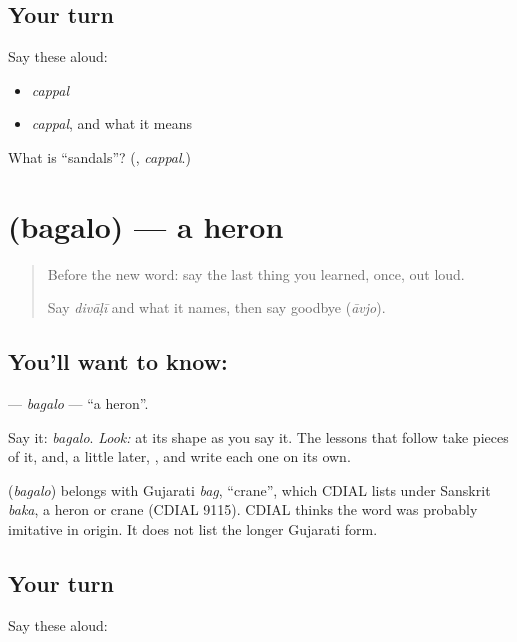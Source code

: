 \subsection*{Your turn}
Say these aloud:

\begin{itemize}
\raggedright
  \item \emph{cappal}
  \item \emph{cappal}, and what it means
\end{itemize}

\begin{tcolorbox}[breakable,colback=teal!4,colframe=teal!35!black,title={Before you move on}]
What is \textquotedblleft{}sandals\textquotedblright{}? (\textbf{}, \emph{cappal}.)
\end{tcolorbox}
\section[\texorpdfstring{\gu{બગલો} (bagalo)}{બગલો (bagalo)}]{ (bagalo) — a heron}

\label{lesson:GU-C05-bagalo}



\begin{quote}
Before the new word: say the last thing you learned, once, out loud.

Say \emph{divāḷī} and what it names, then say goodbye (\emph{āvjo}).
\end{quote}

\subsection*{You'll want to know: }
\textbf{} — \emph{bagalo} — \textquotedblleft{}a heron\textquotedblright{}.

Say it: \emph{bagalo}. \emph{Look:} at its shape as you say it. The lessons that follow take pieces of it, \textbf{} and, a little later, \textbf{}, and write each one on its own.

\begin{cousinweb}
\textbf{} (\emph{bagalo}) belongs with Gujarati \emph{bag}, \textquotedblleft{}crane\textquotedblright{}, which CDIAL lists under Sanskrit \emph{baka}, a heron or crane (CDIAL 9115). CDIAL thinks the word was probably imitative in origin. It does not list the longer Gujarati form.
\end{cousinweb}

\subsection*{Your turn}
Say these aloud:

